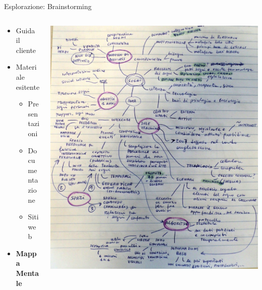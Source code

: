 \documentclass[compress, red, 14pt, pdf]{beamer}
\begin{document}
	\begin{frame}{Esplorazione: Brainstorming}		
		\begin{columns}[T]
		    \begin{column}{.5\textwidth}
				\begin{itemize}
					\item Guida il cliente
					\item Materiale esitente
					\begin{itemize}
						\item Presentazioni
						\item Documentazione
						\item Siti web
					\end{itemize}
				\end{itemize}	

				\begin{itemize}
					\item \textbf{Mappa Mentale}
				\end{itemize}
		    \end{column}
		    \begin{column}{.5\textwidth}
				\hspace*{-0.4cm}
			    \includegraphics[scale=0.18]{images/mindmap.png}
		    \end{column}
		 \end{columns}
	\end{frame}
\end{document}
